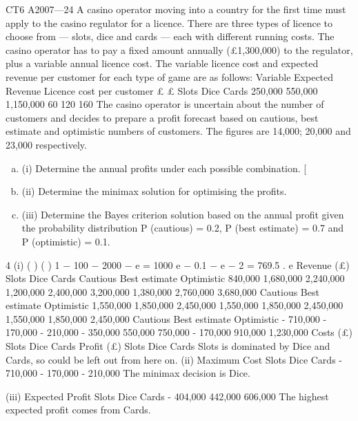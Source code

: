 \documentclass[a4paper,12pt]{article}
\begin{document}

CT6 A2007—24
A casino operator moving into a country for the first time must apply to the casino
regulator for a licence. There are three types of licence to choose from — slots, dice
and cards — each with different running costs. The casino operator has to pay a fixed
amount annually (£1,300,000) to the regulator, plus a variable annual licence cost.
The variable licence cost and expected revenue per customer for each type of game
are as follows:
Variable
Expected Revenue
Licence cost
per customer
£
£
Slots
Dice
Cards
250,000
550,000
1,150,000
60
120
160
The casino operator is uncertain about the number of customers and decides to
prepare a profit forecast based on cautious, best estimate and optimistic numbers of
customers. The figures are 14,000; 20,000 and 23,000 respectively.
\begin{enumerate}[(a)]
\item (i) Determine the annual profits under each possible combination. [
\item (ii) Determine the minimax solution for optimising the profits. 
\item (iii) Determine the Bayes criterion solution based on the annual profit given the
probability distribution P (cautious) = 0.2, P (best estimate) = 0.7 and
P (optimistic) = 0.1.
\end{enumerate}

4
(i)
(
)
(
)
1 − 100 \lambda  − 2000 \lambda 
− e
= 1000 e − 0.1 − e − 2 = 769.5 .
e
\lambda 
Revenue (£)
Slots
Dice
Cards
Cautious Best estimate Optimistic
840,000
1,680,000
2,240,000 1,200,000
2,400,000
3,200,000 1,380,000
2,760,000
3,680,000
Cautious Best estimate Optimistic
1,550,000
1,850,000
2,450,000 1,550,000
1,850,000
2,450,000 1,550,000
1,850,000
2,450,000
Cautious Best estimate Optimistic
- 710,000
- 170,000
- 210,000 - 350,000
550,000
750,000 - 170,000
910,000
1,230,000
Costs (£)
Slots
Dice
Cards
Profit (£)
Slots
Dice
Cards
Slots is dominated by Dice and Cards, so could be left out from here on.
(ii)
Maximum
Cost
Slots
Dice
Cards
- 710,000
- 170,000
- 210,000
The minimax decision is Dice.

(iii)
Expected
Profit
Slots
Dice
Cards
- 404,000
442,000
606,000
The highest expected profit comes from Cards.
\end{document}
